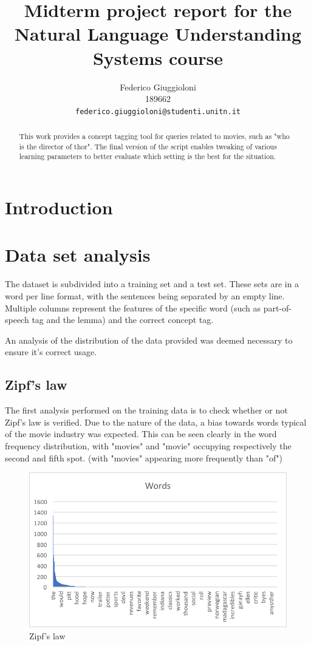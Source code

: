 \documentclass[11pt,a4paper]{article}
\title{Midterm project report for the Natural Language Understanding Systems course}
\author{Federico Giuggioloni \\
  189662 \\
  {\tt federico.giuggioloni@studenti.unitn.it}}
\date{}
\begin{document}
\maketitle
\begin{abstract}
  This work provides a concept tagging tool for queries related to movies, such as "who is the director of thor".
  The final version of the script enables tweaking of various learning parameters to better evaluate which setting is the best for the situation.
\end{abstract}

\section{Introduction}

\section{Data set analysis}

The dataset is subdivided into a training set and a test set.
These sets are in a word per line format, with the sentences being separated by an empty line.
Multiple columns represent the features of the specific word (such as part-of-speech tag and the lemma) and the correct concept tag.

An analysis of the distribution of the data provided was deemed necessary to ensure it's correct usage.

\subsection{Zipf's law}

The first analysis performed on the training data is to check whether or not Zipf's law is verified.
Due to the nature of the data, a bias towards words typical of the movie industry was expected.
This can be seen clearly in the word frequency distribution, with "movies" and "movie" occupying respectively the second and fifth spot.
(with "movies" appearing more frequently than "of")

\begin{figure}[h]
\centering
  \includegraphics[width=.9\linewidth]{Images/zipf}
  \caption{Zipf's law}
\label{fig:zipf}
\end{figure}
\end{document}
